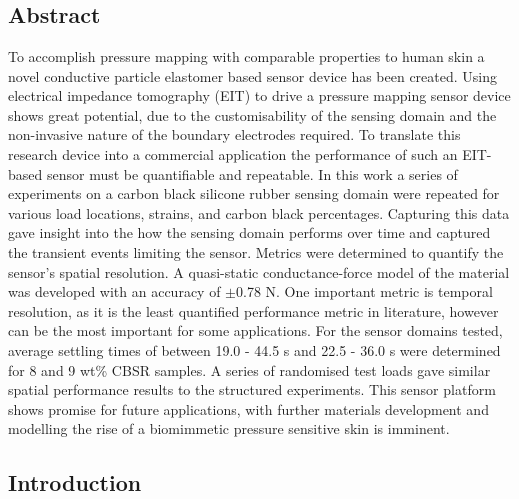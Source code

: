 \chapter{\chapivname}
\label{chapter4}



\section*{Abstract}
To accomplish pressure mapping with comparable properties to human skin a novel conductive particle elastomer based sensor device has been created. Using electrical impedance tomography (EIT) to drive a pressure mapping sensor device shows great potential, due to the customisability of the sensing domain and the non-invasive nature of the boundary electrodes required. To translate this research device into a commercial application the performance of such an EIT-based sensor must be quantifiable and repeatable. In this work a series of experiments on a carbon black silicone rubber sensing domain were repeated for various load locations, strains, and carbon black percentages. Capturing this data gave insight into the how the sensing domain performs over time and captured the transient events limiting the sensor. Metrics were determined to quantify the sensor's spatial resolution. A quasi-static conductance-force model of the material was developed with an accuracy of $\pm$0.78 N. One important metric is temporal resolution, as it is the least quantified performance metric in literature, however can be the most important for some applications. For the sensor domains tested, average settling times of between 19.0 - 44.5 s and 22.5 - 36.0 s were determined for 8 and 9 wt\% CBSR samples. A series of randomised test loads gave similar spatial performance results to the structured experiments. This sensor platform shows promise for future applications, with further materials development and modelling the rise of a biomimmetic pressure sensitive skin is imminent.


\section{Introduction} \label{sec:introduction}

